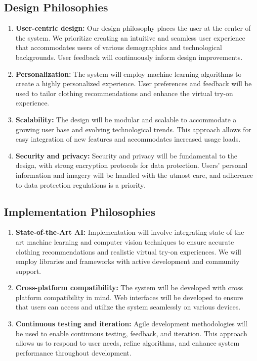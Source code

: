 	\subsection{Design Philosophies}
		\begin{enumerate}
			\item \textbf{User-centric design:} Our design philosophy places the user at the center of the system. We prioritize creating an intuitive and seamless user experience that accommodates users of various demographics and technological backgrounds. User feedback will continuously inform design improvements.
			\item \textbf{Personalization:} The system will employ machine learning algorithms to create a highly personalized experience. User preferences and feedback will be used to tailor clothing recommendations and enhance the virtual try-on experience.
			\item \textbf{Scalability:} The design will be modular and scalable to accommodate a growing user base and evolving technological trends. This approach allows for easy integration of new features and accommodates increased usage loads.
			\item \textbf{Security and privacy:} Security and privacy will be fundamental to the design, with strong encryption protocols for data protection. Users' personal information and imagery will be handled with the utmost care, and adherence to data protection regulations is a priority.
		\end{enumerate}

	\subsection{Implementation Philosophies}
		\begin{enumerate}
			\item \textbf{State-of-the-Art AI:} Implementation will involve integrating state-of-the-art machine learning and computer vision techniques to ensure accurate clothing recommendations and realistic virtual try-on experiences. We will employ libraries and frameworks with active development and community support.
			\item \textbf{Cross-platform compatibility:} The system will be developed with cross platform compatibility in mind. Web interfaces will be developed to ensure that users can access and utilize the system seamlessly on various devices.
			\item \textbf{Continuous testing and iteration:} Agile development methodologies will be used to enable continuous testing, feedback, and iteration. This approach allows us to respond to user needs, refine algorithms, and enhance system performance throughout development.
		\end{enumerate}

